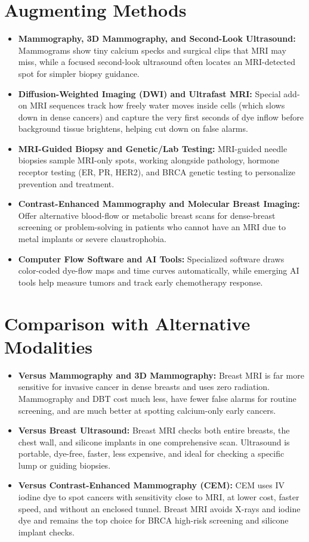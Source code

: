 \section{Augmenting Methods}
\begin{itemize}
\item \textbf{Mammography, 3D Mammography, and Second-Look Ultrasound:} Mammograms show tiny calcium specks and surgical clips that MRI may miss, while a focused second-look ultrasound often locates an MRI-detected spot for simpler biopsy guidance.
\item \textbf{Diffusion-Weighted Imaging (DWI) and Ultrafast MRI:} Special add-on MRI sequences track how freely water moves inside cells (which slows down in dense cancers) and capture the very first seconds of dye inflow before background tissue brightens, helping cut down on false alarms.
\item \textbf{MRI-Guided Biopsy and Genetic/Lab Testing:} MRI-guided needle biopsies sample MRI-only spots, working alongside pathology, hormone receptor testing (ER, PR, HER2), and BRCA genetic testing to personalize prevention and treatment.
\item \textbf{Contrast-Enhanced Mammography and Molecular Breast Imaging:} Offer alternative blood-flow or metabolic breast scans for dense-breast screening or problem-solving in patients who cannot have an MRI due to metal implants or severe claustrophobia.
\item \textbf{Computer Flow Software and AI Tools:} Specialized software draws color-coded dye-flow maps and time curves automatically, while emerging AI tools help measure tumors and track early chemotherapy response.
\end{itemize}

\section{Comparison with Alternative Modalities}
\begin{itemize}
\item \textbf{Versus Mammography and 3D Mammography:} Breast MRI is far more sensitive for invasive cancer in dense breasts and uses zero radiation. Mammography and DBT cost much less, have fewer false alarms for routine screening, and are much better at spotting calcium-only early cancers.
\item \textbf{Versus Breast Ultrasound:} Breast MRI checks both entire breasts, the chest wall, and silicone implants in one comprehensive scan. Ultrasound is portable, dye-free, faster, less expensive, and ideal for checking a specific lump or guiding biopsies.
\item \textbf{Versus Contrast-Enhanced Mammography (CEM):} CEM uses IV iodine dye to spot cancers with sensitivity close to MRI, at lower cost, faster speed, and without an enclosed tunnel. Breast MRI avoids X-rays and iodine dye and remains the top choice for BRCA high-risk screening and silicone implant checks.
\end{itemize}

